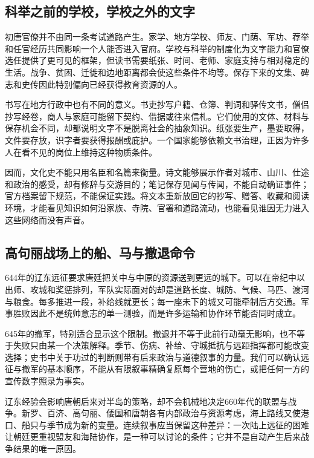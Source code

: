 \subsection{科举之前的学校，学校之外的文字}
初唐官僚并不由同一条考试道路产生。家学、地方学校、师友、门荫、军功、荐举和任官经历共同影响一个人能否进入官府。学校与科举的制度化为文字能力和官僚选任提供了更可见的框架，但读书需要纸张、时间、老师、家庭支持与相对稳定的生活。战争、贫困、迁徙和边地距离都会使这些条件不均等。保存下来的文集、碑志和史传因此特别偏向已经获得教育资源的人。

书写在地方行政中也有不同的意义。书吏抄写户籍、仓簿、判词和驿传文书，僧侣抄写经卷，商人与家庭可能留下契约、借据或往来信札。它们使用的文体、材料与保存机会不同，却都说明文字不是脱离社会的抽象知识。纸张要生产，墨要取得，文件要存放，识字者要获得报酬或庇护。一个国家能够依赖文书治理，正因为许多人在看不见的岗位上维持这种物质条件。

因而，文化史不能只用名臣和名篇来衡量。诗文能够展示作者对城市、山川、仕途和政治的感受，却有修辞与交游目的；笔记保存见闻与传闻，不能自动确证事件；官方档案留下规范，不能保证实践。将文本重新放回它的抄写、赠答、收藏和阅读环境，才能看见知识如何沿家族、寺院、官署和道路流动，也能看见谁因无力进入这些网络而没有声音。

\subsection{高句丽战场上的船、马与撤退命令}
644年的辽东远征要求唐廷把关中与中原的资源送到更远的城下。可以在帝纪中以出师、攻城和奖惩排列，军队实际面对的却是道路长度、城防、气候、马匹、渡河与粮食。每多推进一段，补给线就更长；每一座未下的城又可能牵制后方交通。军事胜败因此不是统帅意志的单一测验，而是许多运输和协作环节能否同时成立。

645年的撤军，特别适合显示这个限制。撤退并不等于此前行动毫无影响，也不等于失败只由某一个决策解释。季节、伤病、补给、守城抵抗与远距指挥都可能改变选择；史书中关于功过的判断则带有后来政治与道德叙事的力量。我们可以确认远征与撤军的基本顺序，不能从有限叙事精确复原每个营地的伤亡，或把任何一方的宣传数字照录为事实。

辽东经验会影响唐朝后来对半岛的策略，却不会机械地决定660年代的联盟与战争。新罗、百济、高句丽、倭国和唐朝各有内部政治与资源考虑，海上路线又使港口、船只与季节成为新的变量。连续叙事应当保留这种差异：一次陆上远征的困难让朝廷更重视盟友和海陆协作，是一种可以讨论的条件；它并不是自动产生后来战争结果的唯一原因。

